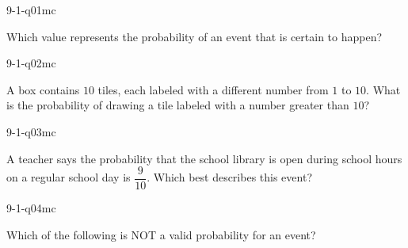 

\begin{practiceQuestion}{9-1-q01}{mc}
\begin{questionText}
Which value represents the probability of an event that is certain to happen?
\end{questionText}
\end{practiceQuestion}

\begin{practiceQuestion}{9-1-q02}{mc}
\begin{questionText}
A box contains $10$ tiles, each labeled with a different number from $1$ to $10$. What is the probability of drawing a tile labeled with a number greater than $10$?
\end{questionText}
\end{practiceQuestion}

\begin{practiceQuestion}{9-1-q03}{mc}
\begin{questionText}
A teacher says the probability that the school library is open during school hours on a regular school day is $\dfrac{9}{10}$. Which best describes this event?
\end{questionText}
\end{practiceQuestion}

\begin{practiceQuestion}{9-1-q04}{mc}
\begin{questionText}
Which of the following is NOT a valid probability for an event?
\end{questionText}
\end{practiceQuestion}

